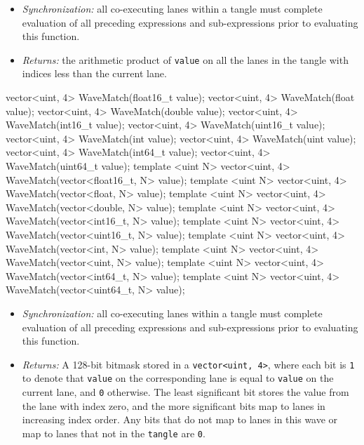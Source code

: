 \begin{itemize}
  \item \textit{Synchronization:} all co-executing \gls{lane}s within a \gls{tangle}
  must complete evaluation of all preceding expressions and sub-expressions
  prior to evaluating this function.
  \item \textit{Returns:} the arithmetic product of \texttt{value} on all the
  \gls{lane}s in the \gls{tangle} with indices less than the current \gls{lane}.
\end{itemize}

\begin{HLSL}
vector<uint, 4> WaveMatch(float16_t value);
vector<uint, 4> WaveMatch(float value);
vector<uint, 4> WaveMatch(double value);
vector<uint, 4> WaveMatch(int16_t value);
vector<uint, 4> WaveMatch(uint16_t value);
vector<uint, 4> WaveMatch(int value);
vector<uint, 4> WaveMatch(uint value);
vector<uint, 4> WaveMatch(int64_t value);
vector<uint, 4> WaveMatch(uint64_t value);
template <uint N> vector<uint, 4> WaveMatch(vector<float16_t, N> value);
template <uint N> vector<uint, 4> WaveMatch(vector<float, N> value);
template <uint N> vector<uint, 4> WaveMatch(vector<double, N> value);
template <uint N> vector<uint, 4> WaveMatch(vector<int16_t, N> value);
template <uint N> vector<uint, 4> WaveMatch(vector<uint16_t, N> value);
template <uint N> vector<uint, 4> WaveMatch(vector<int, N> value);
template <uint N> vector<uint, 4> WaveMatch(vector<uint, N> value);
template <uint N> vector<uint, 4> WaveMatch(vector<int64_t, N> value);
template <uint N> vector<uint, 4> WaveMatch(vector<uint64_t, N> value);
\end{HLSL}

\begin{itemize}
  \item \textit{Synchronization:} all co-executing \gls{lane}s within a \gls{tangle}
  must complete evaluation of all preceding expressions and sub-expressions
  prior to evaluating this function.
  \item \textit{Returns:} A 128-bit bitmask stored in a \texttt{vector<uint,
  4>}, where each bit is \texttt{1} to denote that \texttt{value} on the
  corresponding \gls{lane} is equal to \texttt{value} on the current lane, and
  \texttt{0} otherwise. The least significant bit stores the value from the
  \gls{lane} with index zero, and the more significant bits map to \gls{lane}s
  in increasing index order. Any bits that do not map to \gls{lane}s in this
  \gls{wave} or map to \gls{lane}s that not in the \texttt{tangle} are
  \texttt{0}.
\end{itemize}

